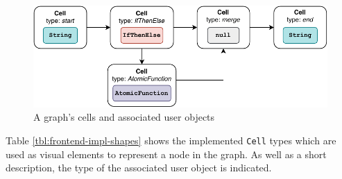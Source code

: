 \documentclass[a4paper,top=25mm,bottom=25mm,12pt,pdftex,halfparskip,twoside,openany,bibtotoc,numbers=noenddot]{scrbook}
\begin{document}
\begin{figure}[h]
  \centering
  \vspace{1.5cm}
  \includegraphics[]{cell-user-objects}
  \caption{A graph's cells and associated user objects}
  \label{fig:graph-context-user-obj}
\end{figure}

\newpage

Table \ref{tbl:frontend-impl-shapes} shows the implemented \texttt{Cell} types which are used as visual elements to represent a node in the graph. As well as a short description, the type of the associated user object is indicated.
\end{document}
